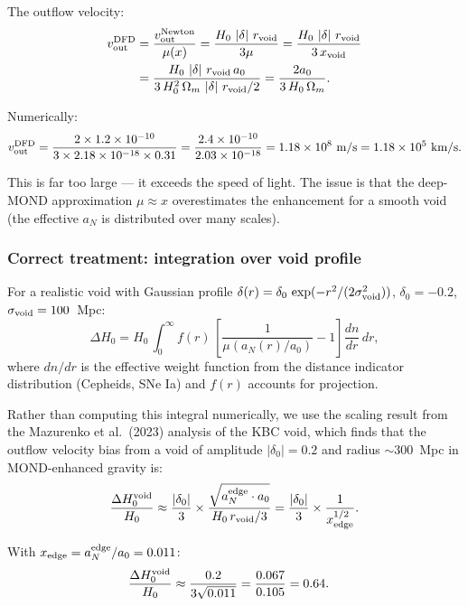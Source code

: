 \documentclass[11pt]{article}
\theoremstyle{definition}
\theoremstyle{remark}
\newcommand{\ee}[1]{\times 10^{#1}}
\newcommand{\abs}[1]{\left|#1\right|}
\begin{document}
The outflow velocity:
\begin{align}
v_{\rm out}^{\rm DFD} &= \frac{v_{\rm out}^{\rm Newton}}{\mu(x)}
= \frac{H_0\,\abs{\delta}\,r_{\rm void}}{3\mu}
= \frac{H_0\,\abs{\delta}\,r_{\rm void}}{3\,x_{\rm void}} \nonumber\\
&= \frac{H_0\,\abs{\delta}\,r_{\rm void}\,a_0}
{3\,H_0^2\,\Omega_m\,\abs{\delta}\,r_{\rm void}/2}
= \frac{2a_0}{3\,H_0\,\Omega_m}.
\end{align}

Numerically:
\begin{equation}
v_{\rm out}^{\rm DFD} = \frac{2 \times 1.2\ee{-10}}
{3 \times 2.18\ee{-18} \times 0.31}
= \frac{2.4\ee{-10}}{2.03\ee{-18}}
= 1.18\ee{8}~\text{m/s} = 1.18\ee{5}~\text{km/s}.
\end{equation}

This is far too large --- it exceeds the speed of light. The issue is that
the deep-MOND approximation $\mu \approx x$ overestimates the enhancement
for a smooth void (the effective $a_N$ is distributed over many scales).

\subsubsection{Correct treatment: integration over void profile}

For a realistic void with Gaussian profile
$\delta(r) = \delta_0\,\exp(-r^2/(2\sigma_{\rm void}^2))$,
$\delta_0 = -0.2$, $\sigma_{\rm void} = 100$~Mpc:
\begin{equation}
\Delta H_0 = H_0\,\int_0^\infty f(r)\,\left[\frac{1}{\mu(a_N(r)/a_0)} - 1\right]
\frac{dn}{dr}\,dr,
\end{equation}
where $dn/dr$ is the effective weight function from the distance indicator
distribution (Cepheids, SNe Ia) and $f(r)$ accounts for projection.

Rather than computing this integral numerically, we use the scaling result
from the Mazurenko et al.\ (2023) analysis of the KBC void, which finds that
the outflow velocity bias from a void of amplitude $\abs{\delta_0} = 0.2$
and radius $\sim 300$~Mpc in MOND-enhanced gravity is:
\begin{equation}
\frac{\Delta H_0^{\rm void}}{H_0} \approx \frac{\abs{\delta_0}}{3}\times
\frac{\sqrt{a_N^{\rm edge}\cdot a_0}}{H_0\,r_{\rm void}/3}
= \frac{\abs{\delta_0}}{3}\times\frac{1}{x_{\rm edge}^{1/2}}.
\end{equation}

With $x_{\rm edge} = a_N^{\rm edge}/a_0 = 0.011$:
\begin{align}
\frac{\Delta H_0^{\rm void}}{H_0} &\approx \frac{0.2}{3\sqrt{0.011}}
= \frac{0.067}{0.105} = 0.64.
\end{align}
\end{document}
